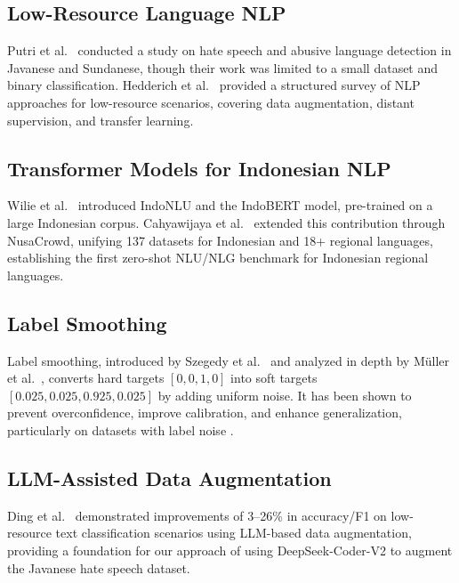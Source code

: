 \documentclass[10pt,twocolumn]{article}
\begin{document}
\subsection{Low-Resource Language NLP}

Putri et al.\ \cite{putri2021} conducted a study on hate speech and abusive language detection in Javanese and Sundanese, though their work was limited to a small dataset and binary classification. Hedderich et al.\ \cite{hedderich2021} provided a structured survey of NLP approaches for low-resource scenarios, covering data augmentation, distant supervision, and transfer learning.

\subsection{Transformer Models for Indonesian NLP}

Wilie et al.\ \cite{wilie2020} introduced IndoNLU and the IndoBERT model, pre-trained on a large Indonesian corpus. Cahyawijaya et al.\ \cite{cahyawijaya2023} extended this contribution through NusaCrowd, unifying 137 datasets for Indonesian and 18+ regional languages, establishing the first zero-shot NLU/NLG benchmark for Indonesian regional languages.

\subsection{Label Smoothing}

Label smoothing, introduced by Szegedy et al.\ \cite{szegedy2015} and analyzed in depth by M\"uller et al.\ \cite{mueller2019}, converts hard targets $[0, 0, 1, 0]$ into soft targets $[0.025, 0.025, 0.925, 0.025]$ by adding uniform noise. It has been shown to prevent overconfidence, improve calibration, and enhance generalization, particularly on datasets with label noise \cite{mueller2019}.

\subsection{LLM-Assisted Data Augmentation}

Ding et al.\ \cite{ding2024} demonstrated improvements of 3--26\% in accuracy/F1 on low-resource text classification scenarios using LLM-based data augmentation, providing a foundation for our approach of using DeepSeek-Coder-V2 to augment the Javanese hate speech dataset.

\end{document}
